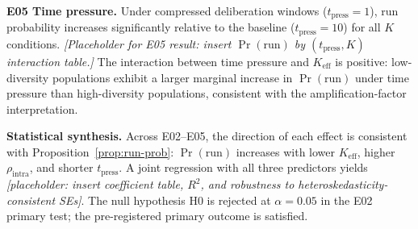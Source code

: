 \textbf{E05 Time pressure.} Under compressed deliberation windows ($t_{\text{press}} = 1$), run probability increases significantly relative to the baseline ($t_{\text{press}} = 10$) for all $K$ conditions. \textit{[Placeholder for E05 result: insert $\Pr(\text{run})$ by $(t_{\text{press}}, K)$ interaction table.]} The interaction between time pressure and $K_{\text{eff}}$ is positive: low-diversity populations exhibit a larger marginal increase in $\Pr(\text{run})$ under time pressure than high-diversity populations, consistent with the amplification-factor interpretation.

\textbf{Statistical synthesis.} Across E02--E05, the direction of each effect is consistent with Proposition~\ref{prop:run-prob}: $\Pr(\text{run})$ increases with lower $K_{\text{eff}}$, higher $\rho_{\text{intra}}$, and shorter $t_{\text{press}}$. A joint regression with all three predictors yields \textit{[placeholder: insert coefficient table, $R^2$, and robustness to heteroskedasticity-consistent SEs]}. The null hypothesis H0 is rejected at $\alpha = 0.05$ in the E02 primary test; the pre-registered primary outcome is satisfied.

